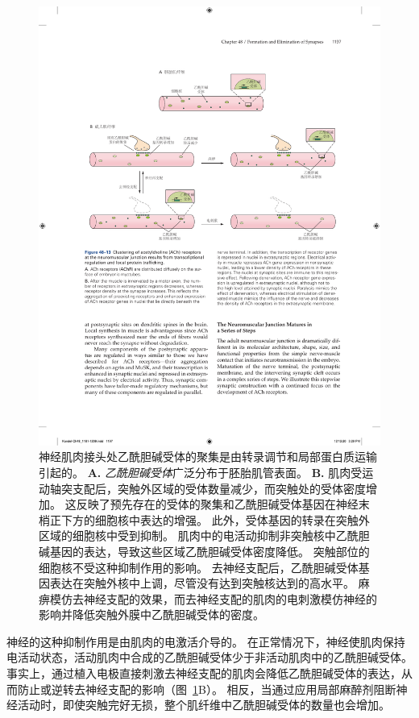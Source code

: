 \begin{figure}[htbp]
	\centering
	\includegraphics[width=0.9\linewidth]{chap48/fig_48_13}
	\caption{神经肌肉接头处乙酰胆碱受体的聚集是由转录调节和局部蛋白质运输引起的。
		\textbf{A.} \textit{乙酰胆碱受体}广泛分布于胚胎肌管表面。
		\textbf{B.} 肌肉受运动轴突支配后，突触外区域的受体数量减少，而突触处的受体密度增加。
		这反映了预先存在的受体的聚集和乙酰胆碱受体基因在神经末梢正下方的细胞核中表达的增强。
		此外，受体基因的转录在突触外区域的细胞核中受到抑制。
		肌肉中的电活动抑制非突触核中乙酰胆碱基因的表达，导致这些区域乙酰胆碱受体密度降低。
		突触部位的细胞核不受这种抑制作用的影响。
		去神经支配后，乙酰胆碱受体基因表达在突触外核中上调，尽管没有达到突触核达到的高水平。
		麻痹模仿去神经支配的效果，而去神经支配的肌肉的电刺激模仿神经的影响并降低突触外膜中乙酰胆碱受体的密度。}
	\label{fig:48_13}
\end{figure}


神经的这种抑制作用是由肌肉的电激活介导的。
在正常情况下，神经使肌肉保持电活动状态，活动肌肉中合成的乙酰胆碱受体少于非活动肌肉中的乙酰胆碱受体。
事实上，通过植入电极直接刺激去神经支配的肌肉会降低乙酰胆碱受体的表达，从而防止或逆转去神经支配的影响（图~\ref{fig:48_13}B）。
相反，当通过应用局部麻醉剂阻断神经活动时，即使突触完好无损，整个肌纤维中乙酰胆碱受体的数量也会增加。



